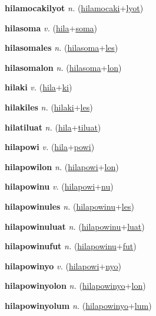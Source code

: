 \textbf{\hypertarget{hilamocakilyot}{hilamocakilyot}} \textit{n.} (\hyperlink{hilamocaki}{hilamocaki}+\allowbreak \hyperlink{lyot}{lyot})


\textbf{\hypertarget{hilasoma}{hilasoma}} \textit{v.} (\hyperlink{hila}{hila}+\allowbreak \hyperlink{soma}{soma})


\textbf{\hypertarget{hilasomales}{hilasomales}} \textit{n.} (\hyperlink{hilasoma}{hilasoma}+\allowbreak \hyperlink{les}{les})


\textbf{\hypertarget{hilasomalon}{hilasomalon}} \textit{n.} (\hyperlink{hilasoma}{hilasoma}+\allowbreak \hyperlink{lon}{lon})


\textbf{\hypertarget{hilaki}{hilaki}} \textit{v.} (\hyperlink{hila}{hila}+\allowbreak \hyperlink{ki}{ki})


\textbf{\hypertarget{hilakiles}{hilakiles}} \textit{n.} (\hyperlink{hilaki}{hilaki}+\allowbreak \hyperlink{les}{les})


\textbf{\hypertarget{hilatiluat}{hilatiluat}} \textit{n.} (\hyperlink{hila}{hila}+\allowbreak \hyperlink{tiluat}{tiluat})


\textbf{\hypertarget{hilapowi}{hilapowi}} \textit{v.} (\hyperlink{hila}{hila}+\allowbreak \hyperlink{powi}{powi})


\textbf{\hypertarget{hilapowilon}{hilapowilon}} \textit{n.} (\hyperlink{hilapowi}{hilapowi}+\allowbreak \hyperlink{lon}{lon})


\textbf{\hypertarget{hilapowinu}{hilapowinu}} \textit{v.} (\hyperlink{hilapowi}{hilapowi}+\allowbreak \hyperlink{nu}{nu})


\textbf{\hypertarget{hilapowinules}{hilapowinules}} \textit{n.} (\hyperlink{hilapowinu}{hilapowinu}+\allowbreak \hyperlink{les}{les})


\textbf{\hypertarget{hilapowinuluat}{hilapowinuluat}} \textit{n.} (\hyperlink{hilapowinu}{hilapowinu}+\allowbreak \hyperlink{luat}{luat})


\textbf{\hypertarget{hilapowinufut}{hilapowinufut}} \textit{n.} (\hyperlink{hilapowinu}{hilapowinu}+\allowbreak \hyperlink{fut}{fut})


\textbf{\hypertarget{hilapowinyo}{hilapowinyo}} \textit{v.} (\hyperlink{hilapowi}{hilapowi}+\allowbreak \hyperlink{nyo}{nyo})


\textbf{\hypertarget{hilapowinyolon}{hilapowinyolon}} \textit{n.} (\hyperlink{hilapowinyo}{hilapowinyo}+\allowbreak \hyperlink{lon}{lon})


\textbf{\hypertarget{hilapowinyolum}{hilapowinyolum}} \textit{n.} (\hyperlink{hilapowinyo}{hilapowinyo}+\allowbreak \hyperlink{lum}{lum})


